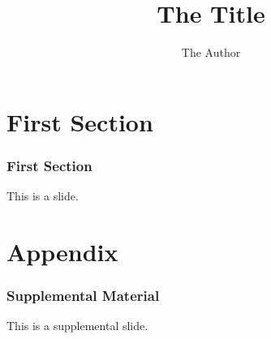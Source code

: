 \documentclass{beamer}
\title{The Title}
\author{The Author}
\begin{document}
\begin{frame}
\titlepage
\end{frame}

\section{First Section} 
\begin{frame}\frametitle{First Section} 
This is a slide.
\end{frame}

\appendix

\section{Appendix}
\begin{frame}\frametitle{Supplemental Material} 
This is a supplemental slide.
\end{frame}
\end{document}
